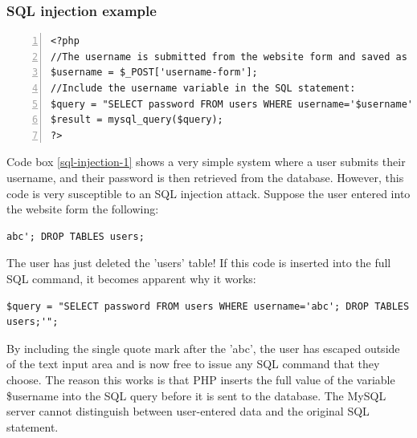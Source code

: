 \documentclass[11pt]{article}
\begin{document}
\subsubsection{SQL injection example}


\begin{lstlisting}[float=ht,numbers=left,frame=lines,caption="Example code showing system susceptible to SQL injection",label=sql-injection-1,showstringspaces=false]
<?php
//The username is submitted from the website form and saved as php variable
$username = $_POST['username-form'];
//Include the username variable in the SQL statement:
$query = "SELECT password FROM users WHERE username='$username'";
$result = mysql_query($query);
?>
\end{lstlisting}

Code box \ref{sql-injection-1} shows a very simple system where a user submits their username, and their password is then retrieved from the database. However, this code is very susceptible to an SQL injection attack. Suppose the user entered into the website form the following:

\begin{lstlisting}[showstringspaces=false]
abc'; DROP TABLES users;
\end{lstlisting}

The user has just deleted the 'users' table! If this code is inserted into the full SQL command, it becomes apparent why it works:

\begin{lstlisting}[showstringspaces=false]
$query = "SELECT password FROM users WHERE username='abc'; DROP TABLES users;'";
\end{lstlisting}

By including the single quote mark after the 'abc', the user has escaped outside of the text input area and is now free to issue any SQL command that they choose. The reason this works is that PHP inserts the full value of the variable \$username into the SQL query before it is sent to the database. The MySQL server cannot distinguish between user-entered data and the original SQL statement.
\end{document}
